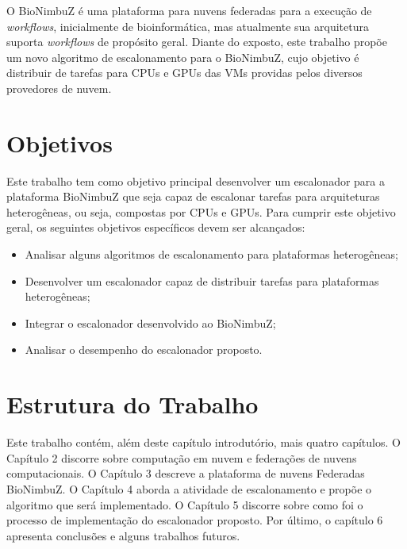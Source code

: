 O BioNimbuZ é uma plataforma para nuvens federadas para a execução de \textit{workflows}, inicialmente de bioinformática, mas atualmente sua arquitetura suporta \textit{workflows} de propósito geral. Diante do exposto, este trabalho propõe um novo algoritmo de escalonamento para o BioNimbuZ, cujo objetivo é distribuir de tarefas para \acrshort{CPU}s e \acrshort{GPU}s das \acrshort{VM}s providas pelos diversos provedores de nuvem.


\section{Objetivos}
Este trabalho tem como objetivo principal desenvolver um escalonador para a plataforma BioNimbuZ que seja capaz de escalonar tarefas para arquiteturas heterogêneas, ou seja, compostas por \acrshort{CPU}s e \acrshort{GPU}s. Para cumprir este objetivo geral, os seguintes objetivos específicos devem ser alcançados: 

\begin{itemize}
	\item Analisar alguns algoritmos de escalonamento para plataformas heterogêneas;
	\item Desenvolver um escalonador capaz de distribuir tarefas para plataformas heterogêneas;
	\item Integrar o escalonador desenvolvido ao BioNimbuZ;
	\item Analisar o desempenho do escalonador proposto.
\end{itemize}

\section{Estrutura do Trabalho}
Este trabalho contém, além deste capítulo introdutório, mais quatro capítulos. O Capítulo 2 discorre sobre computação em nuvem e federações de nuvens computacionais. O Capítulo 3 descreve a plataforma de nuvens Federadas BioNimbuZ. O Capítulo 4 aborda a atividade de escalonamento e propõe o algoritmo que será implementado. O Capítulo 5 discorre sobre como foi o processo de implementação do escalonador proposto. Por último, o capítulo 6 apresenta conclusões e alguns trabalhos futuros.